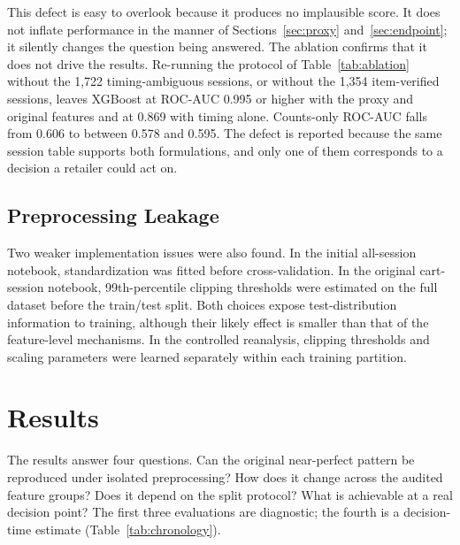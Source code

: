 \documentclass[conference, letterpaper]{IEEEtran}
\begin{document}
This defect is easy to overlook because it produces no implausible score. It does not inflate performance in the manner of Sections~\ref{sec:proxy} and~\ref{sec:endpoint}; it silently changes the question being answered. The ablation confirms that it does not drive the results. Re-running the protocol of Table~\ref{tab:ablation} without the 1,722 timing-ambiguous sessions, or without the 1,354 item-verified sessions, leaves XGBoost at ROC-AUC 0.995 or higher with the proxy and original features and at 0.869 with timing alone. Counts-only ROC-AUC falls from 0.606 to between 0.578 and 0.595. The defect is reported because the same session table supports both formulations, and only one of them corresponds to a decision a retailer could act on.

\subsection{Preprocessing Leakage}
Two weaker implementation issues were also found. In the initial all-session notebook, standardization was fitted before cross-validation. In the original cart-session notebook, 99th-percentile clipping thresholds were estimated on the full dataset before the train/test split. Both choices expose test-distribution information to training, although their likely effect is smaller than that of the feature-level mechanisms. In the controlled reanalysis, clipping thresholds and scaling parameters were learned separately within each training partition.

\section{Results}
The results answer four questions. Can the original near-perfect pattern be reproduced under isolated preprocessing? How does it change across the audited feature groups? Does it depend on the split protocol? What is achievable at a real decision point? The first three evaluations are diagnostic; the fourth is a decision-time estimate (Table~\ref{tab:chronology}).
\end{document}
